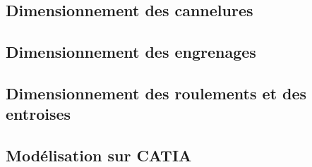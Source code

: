 \documentclass{config}
\begin{document}
\begin{spacing}{1.2}
\subsection{Dimensionnement des cannelures}

\subsection{Dimensionnement des engrenages}

\subsection{Dimensionnement des roulements et des entroises}

\subsection{Modélisation sur CATIA}

\end{spacing}
\end{document}
